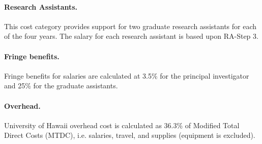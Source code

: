 \documentclass[11pt]{article}
\begin{document}
\paragraph*{Research Assistants.}  
This cost category provides support for two graduate research assistants
for each of the four years.  The salary for each research assistant is
based upon RA-Step 3.

\paragraph*{Fringe benefits.} 
Fringe benefits for salaries are calculated at 3.5\% for the principal
investigator and 25\% for the graduate assistants.

\paragraph*{Overhead.}  
University of Hawaii overhead cost is calculated as 36.3\% of Modified Total
Direct Costs (MTDC), i.e. salaries, travel, and supplies (equipment is
excluded).
\end{document}

